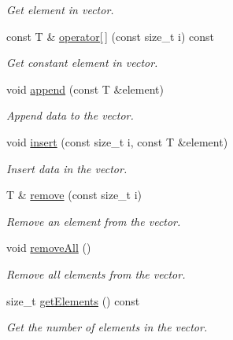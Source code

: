 \begin{DoxyCompactItemize}
\begin{DoxyCompactList}\small\item\em Get element in vector. \item\end{DoxyCompactList}\item 
const T \& \hyperlink{classPandora_1_1Utils_1_1Vector_a36afe1f7fbe55eedfe0aa9a14ed75cfd}{operator\mbox{[}$\,$\mbox{]}} (const size\_\-t i) const 
\begin{DoxyCompactList}\small\item\em Get constant element in vector. \item\end{DoxyCompactList}\item 
void \hyperlink{classPandora_1_1Utils_1_1Vector_a6c1c963c1d58b1e371a07c048c33cdca}{append} (const T \&element)
\begin{DoxyCompactList}\small\item\em Append data to the vector. \item\end{DoxyCompactList}\item 
void \hyperlink{classPandora_1_1Utils_1_1Vector_a8757e06ea29132d0b8873a13b6c1d956}{insert} (const size\_\-t i, const T \&element)
\begin{DoxyCompactList}\small\item\em Insert data in the vector. \item\end{DoxyCompactList}\item 
T \& \hyperlink{classPandora_1_1Utils_1_1Vector_a37cd40a897817d586431d390aaa1345b}{remove} (const size\_\-t i)
\begin{DoxyCompactList}\small\item\em Remove an element from the vector. \item\end{DoxyCompactList}\item 
void \hyperlink{classPandora_1_1Utils_1_1Vector_ab9f631b7ca468cba7f358ee14043b0a6}{removeAll} ()
\begin{DoxyCompactList}\small\item\em Remove all elements from the vector. \item\end{DoxyCompactList}\item 
size\_\-t \hyperlink{classPandora_1_1Utils_1_1Vector_a4d21fd9aff673df56471a9724b36fe2c}{getElements} () const 
\begin{DoxyCompactList}\small\item\em Get the number of elements in the vector. \item\end{DoxyCompactList}\item 

\end{DoxyCompactItemize}
